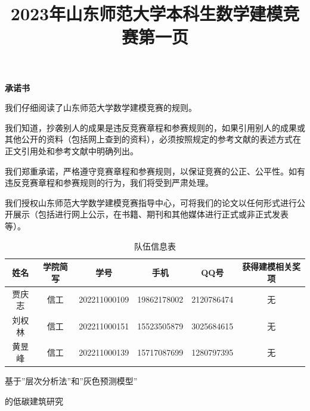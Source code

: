 \documentclass[a4paper, 12pt]{article}
\numberwithin{equation}{section}
\begin{document}
    \title{2023年山东师范大学本科生数学建模竞赛第一页}
    \author{}
    \date{}
    \maketitle

    \thispagestyle{empty}

    \centerline{\textbf{\LARGE{承诺书}}}
    \vspace{22pt}
    我们仔细阅读了山东师范大学数学建模竞赛的规则。

    我们知道，抄袭别人的成果是违反竞赛章程和参赛规则的，如果引用别人的成果或其他公开的资料（包括网上查到的资料），必须按照规定的参考文献的表述方式在正文引用处和参考文献中明确列出。

    我们郑重承诺，严格遵守竞赛章程和参赛规则，以保证竞赛的公正、公平性。如有违反竞赛章程和参赛规则的行为，我们将受到严肃处理。

    我们授权山东师范大学数学建模竞赛指导中心，可将我们的论文以任何形式进行公开展示（包括进行网上公示，在书籍、期刊和其他媒体进行正式或非正式发表等）。

    \begin{table}
        \centering
        \caption{队伍信息表}
        \begin{tabular}{|c|c|c|c|c|c|} \hline
            姓名 & 学院简写 & 学号 & 手机 & QQ号 & 获得建模相关奖项 \\ \hline
            贾庆志 & 信工 & 202211000109 & 19862178002 & 2120786474 & 无 \\ \hline
            刘权林 & 信工 & 202211000151 & 15523505879 & 3025684615 & 无  \\ \hline
            黄昱峰 & 信工 & 202211000139 & 15717087699 & 1280797395 & 无 \\ \hline
        \end{tabular}
    \end{table}

    \newpage

    \pagestyle{plain}
    \setcounter{page}{1}

    \centerline{\LARGE{基于''层次分析法''和''灰色预测模型''}}
    \centerline{\LARGE{的低碳建筑研究}}
    \vspace{22pt}
\end{document}
